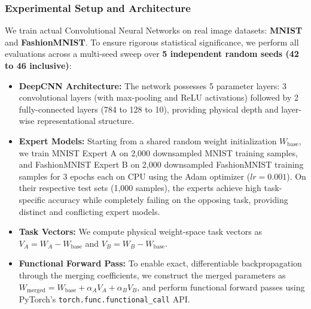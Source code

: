 \subsubsection{Experimental Setup and Architecture}
We train actual Convolutional Neural Networks on real image datasets: \textbf{MNIST} and \textbf{FashionMNIST}.
To ensure rigorous statistical significance, we perform all evaluations across a multi-seed sweep over \textbf{5 independent random seeds (42 to 46 inclusive)}:
\begin{itemize}[noitemsep,topsep=0pt]
    \item \textbf{DeepCNN Architecture:} The network possesses 5 parameter layers: 3 convolutional layers (with max-pooling and ReLU activations) followed by 2 fully-connected layers (784 to 128 to 10), providing physical depth and layer-wise representational structure.
    \item \textbf{Expert Models:} Starting from a shared random weight initialization $W_{\text{base}}$, we train MNIST Expert A on 2,000 downsampled MNIST training samples, and FashionMNIST Expert B on 2,000 downsampled FashionMNIST training samples for 3 epochs each on CPU using the Adam optimizer ($lr=0.001$). On their respective test sets (1,000 samples), the experts achieve high task-specific accuracy while completely failing on the opposing task, providing distinct and conflicting expert models.
    \item \textbf{Task Vectors:} We compute physical weight-space task vectors as $V_{A} = W_A - W_{\text{base}}$ and $V_{B} = W_B - W_{\text{base}}$.
    \item \textbf{Functional Forward Pass:} To enable exact, differentiable backpropagation through the merging coefficients, we construct the merged parameters as $W_{\text{merged}} = W_{\text{base}} + \alpha_A V_A + \alpha_B V_B$, and perform functional forward passes using PyTorch's \texttt{torch.func.functional\_call} API.
\end{itemize}

